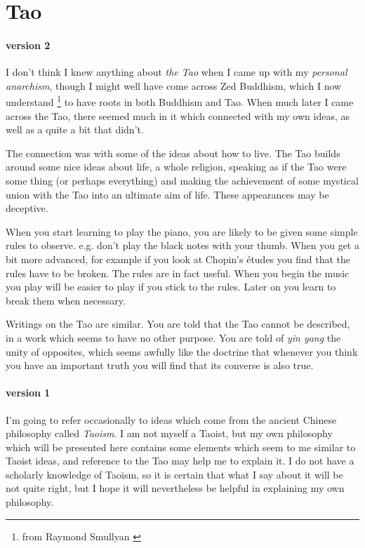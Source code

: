 
\section{Tao}\label{Tao}

\paragraph{version 2}

I don't think I knew anything about {\it the Tao} when I came up with my {\it personal anarchism}, though I might well have come across Zed Buddhism, which I now understand \footnote{from Raymond Smullyan \cite{smullyan77}} to have roots in both Buddhism and Tao.
When much later I came across the Tao, there seemed much in it which connected with my own ideas, as well as a quite a bit that didn't.

The connection was with some of the ideas about how to live.
The Tao builds around some nice ideas about life, a whole religion, speaking as if the Tao were some thing (or perhaps everything) and making the achievement of some mystical union with the Tao into an ultimate aim of life.
These appearances may be deceptive.

When you start learning to play the piano, you are likely to be given some simple rules to observe.
e.g. don't play the black notes with your thumb.
When you get a bit more advanced, for example if you look at Chopin's \'{e}tudes you find that the rules have to be broken.
The rules are in fact useful.
When you begin the music you play will be easier to play if you stick to the rules.
Later on you learn to break them when necessary.

Writings on the Tao are similar.
You are told that the Tao cannot be described, in a work which seems to have no other purpose.
You are told of {\it yin yang} the unity of opposites, which seems awfully like the doctrine that whenever you think you have an important truth you will find that its converse is also true.

\paragraph{version 1}

I'm going to refer occasionally to ideas which come from the ancient Chinese philosophy called {\it Taoism}.
I am not myself a Taoist, but my own philosophy which will be presented here contains some elements which seem to me similar to Taoist ideas, and reference to the Tao may help me to explain it.
I do not have a scholarly knowledge of Taoism, so it is certain that what I say about it will be not quite right, but I hope it will nevertheless be helpful in explaining my own philosophy.

